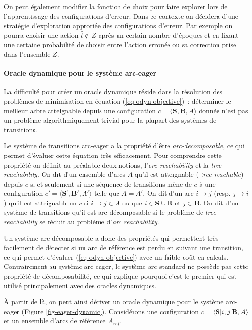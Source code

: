 \documentclass[11pt,openany]{book}
\begin{document}
On peut également modifier la fonction de choix pour faire explorer
lors de l'apprentissage des configurations d'erreur. Dans ce contexte
on décidera d'une stratégie d'exploration approriée des configurations
d'erreur. Par exemple on pourra choisir une action $\hat{t} \not\in Z$
 après un certain nombre d'époques et en fixant une certaine
 probabilité de choisir entre l'action erronée ou sa correction prise
 dans l'ensemble $Z$.

\paragraph{Oracle dynamique pour le système arc-eager}
La difficulté pour créer un oracle dynamique réside dans la résolution
des problèmes de minimisation en équation (\ref{eq-odyn-objective})~:
déterminer le meilleur arbre atteignable depuis une configuration $c =
\langle \mathbf{S},\mathbf{B},A\rangle$ donnée n'est pas un problème
algorithmiquement trivial pour la plupart
des systèmes de transitions.

Le système de transitions arc-eager a la propriété d'être
{\sl arc-decomposable}, ce qui permet d'évaluer cette équation très
efficacement. Pour comprendre cette propriété on définit au préalable deux notions,
l'{\sl arc-reachability} et la {\sl tree-reachability}.
On dit d'un ensemble d'arcs $A$ qu'il est atteignable ({\sl
  tree-reachable}) depuis $c$ si et
seulement si une séquence de transitions mène de $c$ à une
configuration $c' = \langle \mathbf{S}',\mathbf{B}',A'\rangle$
telle que $A= A'$. 
On dit d'un arc $i \rightarrow j$ (resp. $j\rightarrow i$) qu'il est atteignable en $c$ si 
$i \rightarrow j \in A$ ou que $i \in \mathbf{S} \cup \mathbf{B}$
et $j \in \mathbf{B}$.
On dit d'un système de transitions qu'il est arc décomposable si le
problème de {\sl tree reachability} se réduit au problème d'{\sl arc reachability}.

Un système arc décomposable a donc des propriétés qui permettent très
facilement de détecter si un arc de référence est perdu en suivant une
transition, 
ce qui permet d'évaluer (\ref{eq-odyn-objective}) avec un faible coût
en calculs. Contrairement au système arc-eager, le système arc
standard ne possède
pas cette propriété de décomposabilité, ce qui explique pourquoi c'est
le premier qui est utilisé principalement avec des oracles dynamiques.

\`A partir de là, on peut ainsi dériver un oracle dynamique pour le
système arc-eager (Figure \ref{fig-eager-dynamic}). Considérons une configuration  $c = \langle
\mathbf{S}|i, j|\mathbf{B},A\rangle$ et un ensemble d'arcs de
référence $A_{ref}$. 
\end{document}
